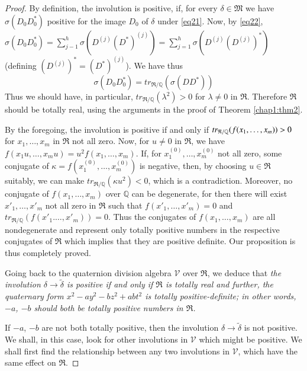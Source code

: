 \begin{proof}
By definition, the involution is positive, if, for every $\delta \in
\mathfrak{M}$ we have $\sigma(D_0 D^{\ast}_0)$ positive for the image
$D_0$ of $\delta$ under \eqref{eq21}. Now, by \eqref{eq22}, $\sigma(D_0 D^{\ast}_0) =
\sum\limits^h_{j-1} \sigma (D^{(j)} (D^{\ast})^{(j)}) =
\sum\limits^h_{j=1} \sigma (D^{(j)} (D^{(j)})^{\ast})$ (defining
$(D^{(j)})^{\ast} = (D^{\ast})^{(j)}$). We have thus
$$
\sigma (D_0 D^{\ast}_0) = tr_{\mathfrak{R}/\mathbb{Q}} (\sigma (D D^{\ast}))
$$
Thus we should have, in particular,
$tr_{\mathfrak{R}/\mathbb{Q}}(\lambda^2)>0$ for $\lambda \neq 0$ in
$\mathfrak{R}$. Therefore $\mathfrak{R}$ should be totally real, using
the arguments in the proof of Theorem \ref{chap1:thm2}.

By the foregoing, the involution is positive if and only if
$tr_{\mathfrak{R}/\mathbb{Q}} (f(x_1,\break\ldots, x_m)) >0$ for
$x_1,\ldots, x_m$ in $\mathfrak{R}$ not all zero. Now, for
\pageoriginale $u\neq 0$ in $\mathfrak{R}$, we have $f(x_1 u, \ldots,
x_m u) = u^2 f(x_1,\ldots, x_m)$. If, for $x^{(0)}_1,\ldots,
x^{(0)}_m$ not all zero, some conjugate of $\kappa = f(x^{(0)}_1,
\ldots, x^{(0)}_m)$ is negative, then, by choosing $u\in \mathfrak{R}$
suitably, we can make $tr_{\mathfrak{R}/\mathbb{Q}}(\kappa u^2) <0$,
which is a contradiction. Moreover, no conjugate of $f(x_1, \ldots,
x_m)$ over $\mathbb{Q}$ can be degenerate, for then there will exist
$x'_1,\ldots, x'_m$ not all zero in $\mathfrak{R}$ such that
$f(x'_1,\ldots, x'_m) = 0$ and
$tr_{\mathfrak{R}/\mathbb{Q}}(f(x'_1.\ldots, x'_m)) = 0$. Thus the
conjugates of $f(x_1,\ldots, x_m)$ are all nondegenerate and represent
only totally positive numbers in the respective conjugates of
$\mathfrak{R}$ which implies that they are positive definite. Our
proposition is thus completely proved.

Going back to the quaternion division algebra $\mathscr{V}$ over
$\mathfrak{R}$, we deduce that {\em the involution $\delta \rightarrow
  \widetilde{\delta}$ is positive if and only if $\mathfrak{R}$ is
  totally real and further, the quaternary form $x^2-ay^2 - bz^2 +
  abt^2$ is totally positive-definite; in other words, $-a$, $-b$
  should both be totally positive numbers in $\mathfrak{R}$.}

If $-a$, $-b$ are not both totally positive, then the involution
$\delta \rightarrow \widetilde{\delta}$ is not positive. We shall, in
this case, look for other involutions in $\mathscr{V}$ which might be
positive. We shall first find the relationship between any two
involutions in $\mathscr{V}$, which have the same effect on
$\mathfrak{R}$.

\end{proof}

